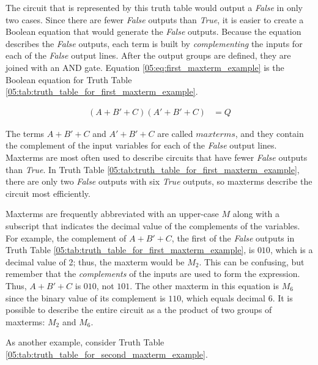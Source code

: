 The circuit that is represented by this truth table would output a \emph{False} in only two cases. Since there are fewer \emph{False} outputs than \emph{True}, it is easier to create a Boolean equation that would generate the \emph{False} outputs. Because the equation describes the \emph{False} outputs, each term is built by \emph{complementing} the inputs for each of the \emph{False} output lines. After the output groups are defined, they are joined with an \textsf{AND} gate. Equation \ref{05:eq:first_maxterm_example} is the Boolean equation for Truth Table \ref{05:tab:truth_table_for_first_maxterm_example}.

\begin{align}
  \label{05:eq:first_maxterm_example}
  (A+B'+C)(A'+B'+C) &= Q
\end{align}

The terms $ A+B'+C $ and $ A'+B'+C $ are called $ maxterms $, and they contain the complement of the input variables for each of the \emph{False} output lines. Maxterms are most often used to describe circuits that have fewer \emph{False} outputs than \emph{True}. In Truth Table \ref{05:tab:truth_table_for_first_maxterm_example}, there are only two \emph{False} outputs with six \emph{True} outputs, so maxterms describe the circuit most efficiently.

Maxterms are frequently abbreviated with an upper-case  $ M $ along with a subscript that indicates the decimal value of the complements of the variables. For example, the complement of $ A+B'+C $, the first of the \emph{False} outputs in Truth Table \ref{05:tab:truth_table_for_first_maxterm_example}, is $ 010 $, which is a decimal value of 2; thus, the maxterm would be $ M_2 $. This can be confusing, but remember that the \emph{complements} of the inputs are used to form the expression. Thus, $ A+B'+C $ is $ 010 $, not $ 101 $. The other maxterm in this equation is $ M_6 $ since the binary value of its complement is $ 110 $, which equals decimal 6. It is possible to describe the entire circuit as a the product of two groups of maxterms: $ M_2 $ and $ M_6 $.

As another example, consider Truth Table \ref{05:tab:truth_table_for_second_maxterm_example}.

